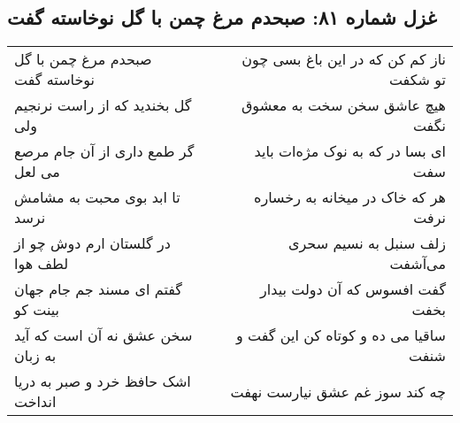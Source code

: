 \begin{center}
\section*{غزل شماره ۸۱: صبحدم مرغ چمن با گل نوخاسته گفت}
\label{sec:sh081}
\begin{longtable}{l p{0.5cm} r}
صبحدم مرغ چمن با گل نوخاسته گفت
&&
ناز کم کن که در این باغ بسی چون تو شکفت
\\
گل بخندید که از راست نرنجیم ولی
&&
هیچ عاشق سخن سخت به معشوق نگفت
\\
گر طمع داری از آن جام مرصع می لعل
&&
ای بسا در که به نوک مژه‌ات باید سفت
\\
تا ابد بوی محبت به مشامش نرسد
&&
هر که خاک در میخانه به رخساره نرفت
\\
در گلستان ارم دوش چو از لطف هوا
&&
زلف سنبل به نسیم سحری می‌آشفت
\\
گفتم ای مسند جم جام جهان بینت کو
&&
گفت افسوس که آن دولت بیدار بخفت
\\
سخن عشق نه آن است که آید به زبان
&&
ساقیا می ده و کوتاه کن این گفت و شنفت
\\
اشک حافظ خرد و صبر به دریا انداخت
&&
چه کند سوز غم عشق نیارست نهفت
\\
\end{longtable}
\end{center}
